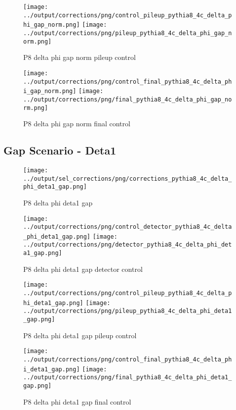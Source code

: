 \documentclass[11pt]{book}
\begin{document}
\begin{figure}[ht]
\centering
\texttt{[image: ../output/corrections/png/control\_pileup\_pythia8\_4c\_delta\_phi\_gap\_norm.png]}
\texttt{[image: ../output/corrections/png/pileup\_pythia8\_4c\_delta\_phi\_gap\_norm.png]}
\caption{P8 delta phi gap norm pileup control}
\label{fig:p8_delta_phi_gap_norm_pileup_control}
\end{figure}


\begin{figure}[ht]
\centering
\texttt{[image: ../output/corrections/png/control\_final\_pythia8\_4c\_delta\_phi\_gap\_norm.png]}
\texttt{[image: ../output/corrections/png/final\_pythia8\_4c\_delta\_phi\_gap\_norm.png]}
\caption{P8 delta phi gap norm final control}
\label{fig:p8_delta_phi_gap_norm_final_control}
\end{figure}

\clearpage
\subsection{Gap Scenario - Deta1}
\begin{figure}[ht]
\centering
\texttt{[image: ../output/sel\_corrections/png/corrections\_pythia8\_4c\_delta\_phi\_deta1\_gap.png]}
\caption{P8 delta phi deta1 gap}
\label{fig:p8_delta_phi_deta1_gap}
\end{figure}

\begin{figure}[ht]
\centering
\texttt{[image: ../output/corrections/png/control\_detector\_pythia8\_4c\_delta\_phi\_deta1\_gap.png]}
\texttt{[image: ../output/corrections/png/detector\_pythia8\_4c\_delta\_phi\_deta1\_gap.png]}
\caption{P8 delta phi deta1 gap detector control}
\label{fig:p8_delta_phi_deta1_gap_detector_control}
\end{figure}

\begin{figure}[ht]
\centering
\texttt{[image: ../output/corrections/png/control\_pileup\_pythia8\_4c\_delta\_phi\_deta1\_gap.png]}
\texttt{[image: ../output/corrections/png/pileup\_pythia8\_4c\_delta\_phi\_deta1\_gap.png]}
\caption{P8 delta phi deta1 gap pileup control}
\label{fig:p8_delta_phi_deta1_gap_pileup_control}
\end{figure}


\begin{figure}[ht]
\centering
\texttt{[image: ../output/corrections/png/control\_final\_pythia8\_4c\_delta\_phi\_deta1\_gap.png]}
\texttt{[image: ../output/corrections/png/final\_pythia8\_4c\_delta\_phi\_deta1\_gap.png]}
\caption{P8 delta phi deta1 gap final control}
\label{fig:p8_delta_phi_deta1_gap_final_control}
\end{figure}
\end{document}
